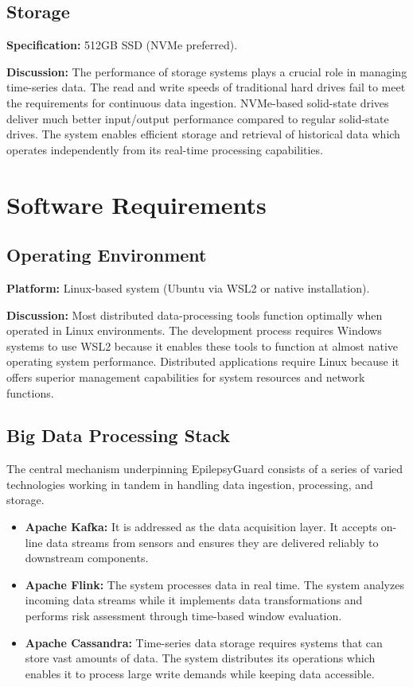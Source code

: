 \documentclass[12pt, a4paper, oneside]{report}
\begin{document}
\subsection{Storage}

\textbf{Specification:} 512GB SSD (NVMe preferred).

\textbf{Discussion:}  
The performance of storage systems plays a crucial role in managing time-series data. The read and write speeds of traditional hard drives fail to meet the requirements for continuous data ingestion. NVMe-based solid-state drives deliver much better input/output performance compared to regular solid-state drives. The system enables efficient storage and retrieval of historical data which operates independently from its real-time processing capabilities.

\section{Software Requirements}

\subsection{Operating Environment}

\textbf{Platform:} Linux-based system (Ubuntu via WSL2 or native installation).

\textbf{Discussion:}  
Most distributed data-processing tools function optimally when operated in Linux environments. The development process requires Windows systems to use WSL2 because it enables these tools to function at almost native operating system performance. Distributed applications require Linux because it offers superior management capabilities for system resources and network functions.

\subsection{Big Data Processing Stack}

The central mechanism underpinning EpilepsyGuard consists of a series of varied technologies working in tandem in handling data ingestion, processing, and storage.

\begin{itemize}
    \item \textbf{Apache Kafka:}  
    It is addressed as the data acquisition layer. It accepts on-line data streams from sensors and ensures they are delivered reliably to downstream components.

    \item \textbf{Apache Flink:}  
    The system processes data in real time. The system analyzes incoming data streams while it implements data transformations and performs risk assessment through time-based window evaluation.

    \item \textbf{Apache Cassandra:}  
    Time-series data storage requires systems that can store vast amounts of data. The system distributes its operations which enables it to process large write demands while keeping data accessible.
\end{itemize}
\end{document}
